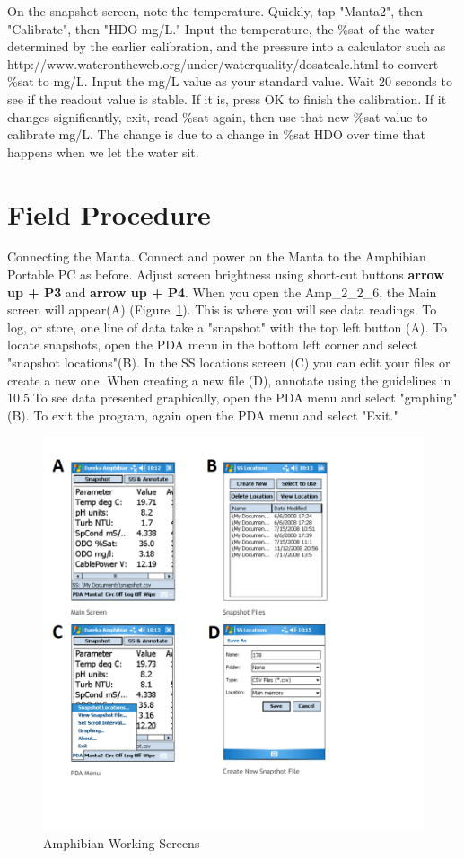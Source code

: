 \documentclass[12pt]{../SOP3}\usepackage[]{graphicx}\usepackage[]{color}
\begin{document}
\NP On the snapshot screen, note the temperature. Quickly, tap "Manta2", then "Calibrate", then "HDO mg/L." Input the temperature, the \%sat of the water determined by the earlier calibration, and the pressure into a calculator such as http://www.waterontheweb.org/under/waterquality/dosatcalc.html to convert \%sat to mg/L. Input the mg/L value as your standard value. Wait 20 seconds to see if the readout value is stable. If it is, press OK to finish the calibration. If it changes significantly, exit, read \%sat again, then use that new \%sat value to calibrate mg/L. The change is due to a change in \%sat HDO over time that happens when we let the water sit. 

\section{Field Procedure}

\NP Connecting the Manta. Connect and power on the Manta to the Amphibian Portable PC as before. Adjust screen brightness using short-cut buttons \textbf{arrow up + P3} and \textbf{arrow up + P4}. When you open the Amp\_2\_2\_6, the Main screen will appear(A) (Figure~\ref{fig:AmphibianMain.png}). This is where you will see data readings. To log, or store, one line of data take a "snapshot" with the top left button (A). To locate snapshots, open the PDA menu in the bottom left corner and select "snapshot locations"(B). In the SS locations screen (C) you can edit your files or create a new one. When creating a new file (D), annotate using the guidelines in 10.5.To see data presented graphically, open the PDA menu and select "graphing" (B). To exit the program, again open the PDA menu and select "Exit."

\begin{figure}[h]
\centering
\includegraphics[scale=0.6]{AmphibianMain.png}
\caption{Amphibian Working Screens}
\label{fig:AmphibianMain.png}
\end{figure}
\end{document}
